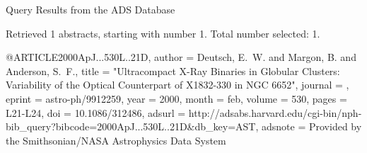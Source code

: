 Query Results from the ADS Database


Retrieved 1 abstracts, starting with number 1.  Total number selected: 1.

@ARTICLE{2000ApJ...530L..21D,
   author = {{Deutsch}, E.~W. and {Margon}, B. and {Anderson}, S.~F.},
    title = "{Ultracompact X-Ray Binaries in Globular Clusters: Variability of the Optical Counterpart of X1832-330 in NGC 6652}",
  journal = {\apjl},
   eprint = {astro-ph/9912259},
     year = 2000,
    month = feb,
   volume = 530,
    pages = {L21-L24},
      doi = {10.1086/312486},
   adsurl = {http://adsabs.harvard.edu/cgi-bin/nph-bib_query?bibcode=2000ApJ...530L..21D&db_key=AST},
  adsnote = {Provided by the Smithsonian/NASA Astrophysics Data System}
}


